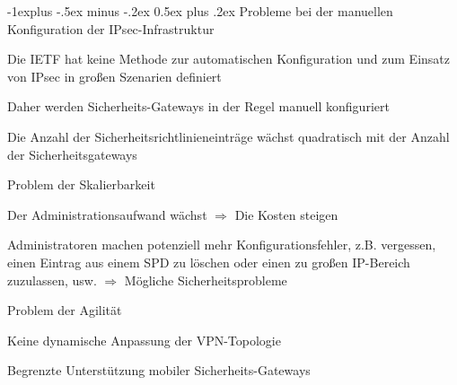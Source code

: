 \documentclass[a4paper]{article}
\makeatletter
\renewcommand{\subsection}{\@startsection{subsection}{2}{0mm}%
 {-1explus -.5ex minus -.2ex}%
 {0.5ex plus .2ex}%
 {\normalfont\normalsize\bfseries}}
\makeatother
\begin{document}
\begin{multicols}{3}
      \subsection{Probleme bei der manuellen Konfiguration der IPsec-Infrastruktur}
      \begin{itemize*}
            \item Die IETF hat keine Methode zur automatischen Konfiguration und zum Einsatz von IPsec in großen Szenarien definiert
            \item Daher werden Sicherheits-Gateways in der Regel manuell konfiguriert
            \begin{itemize*}
                  \item Die Anzahl der Sicherheitsrichtlinieneinträge wächst quadratisch mit der Anzahl der Sicherheitsgateways
                  \item Problem der Skalierbarkeit
                  \begin{itemize*}
                        \item Der Administrationsaufwand wächst $\Rightarrow$ Die Kosten steigen
                        \item Administratoren machen potenziell mehr Konfigurationsfehler, z.B. vergessen, einen Eintrag aus einem SPD zu löschen oder einen zu großen IP-Bereich zuzulassen, usw. $\Rightarrow$ Mögliche Sicherheitsprobleme
                  \end{itemize*}
            \end{itemize*}
            \item Problem der Agilität
            \begin{itemize*}
                  \item Keine dynamische Anpassung der VPN-Topologie
                  \item Begrenzte Unterstützung mobiler Sicherheits-Gateways
            \end{itemize*}
      \end{itemize*}


\end{multicols}
\end{document}
